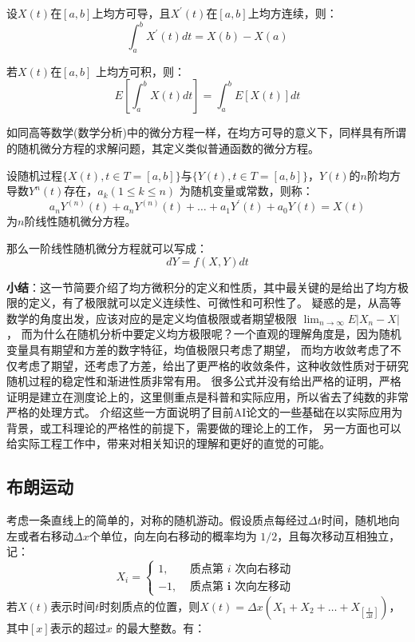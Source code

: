 \documentclass[lang=cn,newtx,10pt,scheme=chinese]{elegantbook}
\begin{document}
\begin{theorem}[牛顿-莱布尼茨公式]
  设$X(t)$在$[a, b]$上均方可导，且$X^{\prime}(t)$在$[a, b]$上均方连续，则：
  \begin{equation}
    \int_a^b X^{\prime}(t) d t=X(b)-X(a)
  \end{equation}
\end{theorem}

\begin{theorem}
  若$X(t)$在$[a, b]$ 上均方可积，则：
  \begin{equation}
    E\left[\int_a^b X(t) d t\right]=\int_a^b E[X(t)] d t
  \end{equation}
\end{theorem}

如同高等数学(数学分析)中的微分方程一样，在均方可导的意义下，同样具有所谓的随机微分方程的求解问题，其定义类似普通函数的微分方程。

\begin{definition}
  设随机过程$\{X(t), t \in T =[a, b] \}$与$\{Y(t), t \in T =[a, b] \}$，$Y(t)$的$n$阶均方导数$Y^{n}(t)$存在，$a_k(1 \leq k \leq n)$
  为随机变量或常数，则称：
  \begin{equation}
    a_n Y^{(n)}(t)+a_n Y^{(n)}(t)+\ldots+a_1 Y^{\prime}(t)+a_0 Y(t)=X(t)
  \end{equation}
  为$n$阶线性随机微分方程。
\end{definition}
那么一阶线性随机微分方程就可以写成：
\begin{equation}
  dY = f(X, Y) dt
\end{equation}

\textbf{小结}：这一节简要介绍了均方微积分的定义和性质，其中最关键的是给出了均方极限的定义，有了极限就可以定义连续性、可微性和可积性了。
疑惑的是，从高等数学的角度出发，应该对应的是定义均值极限或者期望极限 $\lim_{n\rightarrow \infty}E|X_n - X|$，
而为什么在随机分析中要定义均方极限呢？一个直观的理解角度是，因为随机变量具有期望和方差的数字特征，均值极限只考虑了期望，
而均方收敛考虑了不仅考虑了期望，还考虑了方差，给出了更严格的收敛条件，这种收敛性质对于研究随机过程的稳定性和渐进性质非常有用。
很多公式并没有给出严格的证明，严格证明是建立在测度论上的，这里侧重点是科普和实际应用，所以省去了纯数的非常严格的处理方式。
介绍这些一方面说明了目前AI论文的一些基础在以实际应用为背景，或工科理论的严格性的前提下，需要做的理论上的工作，
另一方面也可以给实际工程工作中，带来对相关知识的理解和更好的直觉的可能。

\subsection{布朗运动}
考虑一条直线上的简单的，对称的随机游动。假设质点每经过$\Delta t$时间，随机地向左或者右移动$\Delta x$个单位，向左向右移动的概率均为
$1/2$，且每次移动互相独立，记：
\begin{equation}
  X_i= \begin{cases}1, & \text { 质点第 } i \text { 次向右移动 } \\ -1, & \text { 质点第 } \boldsymbol{i} \text { 次向左移动 }\end{cases}
\end{equation}
若$X(t)$表示时间$t$时刻质点的位置，则$X(t)=\Delta x(X_1 + X_2 + \dots + X_{[\frac{t}{\Delta t}]})$，其中$[x]$表示的超过$x$
的最大整数。有：
\end{document}
